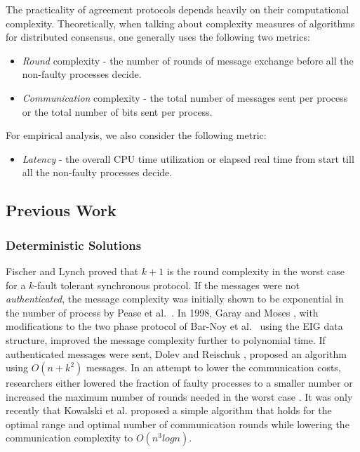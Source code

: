 The practicality of agreement protocols depends heavily on their computational complexity. Theoretically, when talking about complexity measures of algorithms for distributed consensus, one generally uses the following two metrics:
\begin{itemize}
\item \textit{Round} complexity - the number of rounds of message exchange before all the non-faulty processes decide.
\item \textit{Communication} complexity - the total number of messages sent per process or the total number of bits sent per process.
\end{itemize}
For empirical analysis, we also consider the following metric: 
\begin{itemize}
\item \textit{Latency} - the overall CPU time utilization or elapsed real time from start till all the non-faulty processes decide.
\end{itemize}

\subsection{Previous Work}

\subsubsection{Deterministic Solutions}
Fischer and Lynch \cite{Fischer81alower} proved that $k + 1$ is the round
complexity in the worst case for a $k$-fault tolerant synchronous protocol. If
the messages were not \textit{authenticated}, the message complexity was
initially shown to be exponential in the number of process by Pease et
al.~\cite{PeaseSL80}. In 1998, Garay and Moses \cite{GarayM98}, with
modifications to the two phase protocol of Bar-Noy et al.~\cite{BDDS87} using
the EIG data structure, improved the message complexity further to polynomial
time. If authenticated messages were sent, Dolev and Reischuk \cite{DolevR85},
proposed an algorithm using $O(n + k^2)$ messages. In an attempt to lower the
communication costs, researchers either lowered the fraction of faulty
processes to a smaller number \cite{DRS90} or increased the maximum number of
rounds needed in the worst case \cite{TPS87}. It was only recently that
Kowalski et al. \cite{KM13} proposed a simple algorithm that holds for the
optimal range and optimal number of communication rounds while lowering the
communication complexity to $O(n^{3}logn)$.

